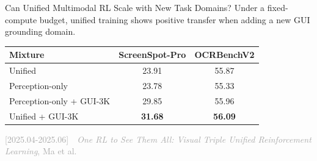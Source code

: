 \begin{frame}{\Large Can Unified Multimodal RL Scale with New Task Domains?}
  \centering
  \vspace{0.45cm}
  {\fontsize{11}{12}\selectfont Under a fixed-compute budget, unified training shows positive transfer when adding a new GUI grounding domain.}

  \vspace{0.35cm}
  \begingroup
  \setlength{\tabcolsep}{16pt}
  \renewcommand{\arraystretch}{1.20}
  {\small
  \begin{tabular}{@{}lcc@{}}
    \toprule
    Mixture & ScreenSpot-Pro & OCRBenchV2 \\
    \midrule
    Unified & 23.91 & 55.87 \\
    Perception-only & 23.78 & 55.33 \\
    Perception-only + GUI-3K & 29.85 & 55.96 \\
    Unified + GUI-3K & \textbf{31.68} & \textbf{56.09} \\
    \bottomrule
  \end{tabular}
  }
  \endgroup

  \vspace{0.35cm}

  \vfill
  \begin{flushright}
    {\fontsize{5.5}{5}\selectfont \textcolor{darkgray}{[2025.04-2025.06]~~\textit{One RL to See Them All: Visual Triple Unified Reinforcement Learning}, Ma et al.}}
  \end{flushright}
\end{frame}



